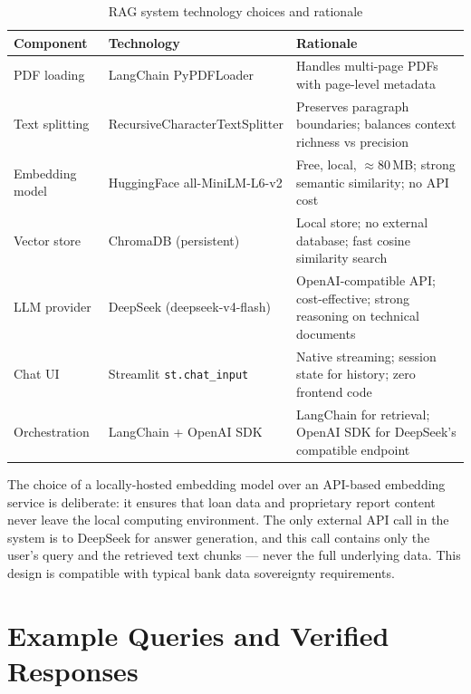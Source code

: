 \documentclass[12pt,a4paper]{report}
\begin{document}
\begin{table}[H]
\centering
\caption{RAG system technology choices and rationale}
\label{tab:rag_stack}
\begin{tabularx}{\textwidth}{llX}
\toprule
\textbf{Component} & \textbf{Technology} & \textbf{Rationale} \\
\midrule
PDF loading      & LangChain PyPDFLoader       & Handles multi-page PDFs with page-level metadata \\
Text splitting   & RecursiveCharacterTextSplitter & Preserves paragraph boundaries; balances context richness vs precision \\
Embedding model  & HuggingFace all-MiniLM-L6-v2  & Free, local, $\approx$80\,MB; strong semantic similarity; no API cost \\
Vector store     & ChromaDB (persistent)       & Local store; no external database; fast cosine similarity search \\
LLM provider     & DeepSeek (deepseek-v4-flash) & OpenAI-compatible API; cost-effective; strong reasoning on technical documents \\
Chat UI          & Streamlit \texttt{st.chat\_input} & Native streaming; session state for history; zero frontend code \\
Orchestration    & LangChain + OpenAI SDK      & LangChain for retrieval; OpenAI SDK for DeepSeek's compatible endpoint \\
\bottomrule
\end{tabularx}
\end{table}

\medskip
\noindent The choice of a locally-hosted embedding model over an API-based embedding service is deliberate: it ensures that loan data and proprietary report content never leave the local computing environment. The only external API call in the system is to DeepSeek for answer generation, and this call contains only the user's query and the retrieved text chunks --- never the full underlying data. This design is compatible with typical bank data sovereignty requirements.

\section{Example Queries and Verified Responses}
\end{document}
